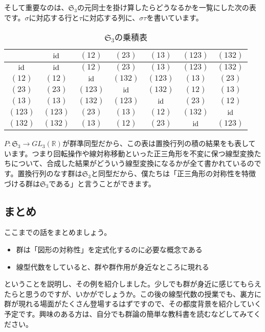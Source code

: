 そして重要なのは、$\mathfrak{S}_3$の元同士を掛け算したらどうなるかを一覧にした次の表です。$\sigma$に対応する行と$\tau$に対応する列に、$\sigma\tau$を書いています。
\begin{table}[h!tbp]
\centering
\caption{$\mathfrak{S}_3$の乗積表}
\begin{tabular}{c|cccccc} \hline
		&	$\operatorname{id}$	&	$(12)$	&	$(23)$	&	$(13)$	&	$(123)$	&	$(132)$ \\ \hline
$\operatorname{id}$	&	$\operatorname{id}$	&	$(12)$	&	$(23)$	&	$(13)$	&	$(123)$	&	$(132)$ \\
$(12)$	&	$(12)$	&	$\operatorname{id}$	&	$(132)$	&	$(123)$	&	$(13)$	&	$(23)$ \\
$(23)$	&	$(23)$	&	$(123)$	&	$\operatorname{id}$	&	$(132)$	&	$(12)$	&	$(13)$ \\
$(13)$	&	$(13)$	&	$(132)$	&	$(123)$	&	$\operatorname{id}$	&	$(23)$	&	$(12)$ \\
$(123)$	&	$(123)$	&	$(23)$	&	$(13)$	&	$(12)$	&	$(132)$	&	$\operatorname{id}$ \\
$(132)$	&	$(132)$	&	$(13)$	&	$(12)$	&	$(23)$	&	$\operatorname{id}$	&	$(123)$ \\ \hline
\end{tabular}
\end{table}

$P\colon \mathfrak{S}_3 \rightarrow GL_3(\mathbb{R})$が群準同型だから、この表は置換行列の積の結果をも表しています。つまり回転操作や線対称移動といった正三角形を不変に保つ線型変換たちについて、合成した結果がどういう線型変換になるかが全て書かれているのです。置換行列のなす群は$\mathfrak{S}_3$と同型だから、僕たちは「正三角形の対称性を特徴づける群は$\mathfrak{S}_3$である」と言うことができます。

\subsection{まとめ}

ここまでの話をまとめましょう。
\begin{itemize}
\item 群は「図形の対称性」を定式化するのに必要な概念である
\item 線型代数をしていると、群や群作用が身近なところに現れる
\end{itemize}
ということを説明し、その例を紹介しました。少しでも群が身近に感じてもらえたらと思うのですが、いかがでしょうか。この後の線型代数の授業でも、裏方に群が現れる場面がたくさん登場するはずですので、その都度背景を紹介していく予定です。興味のある方は、自分でも群論の簡単な教科書を読むなどしてみてください。

